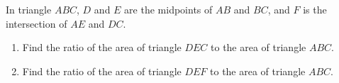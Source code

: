 In triangle $ABC$, $D$ and $E$ are the midpoints of $AB$ and $BC$, and $F$ is the intersection of $AE$ and $DC$.
\begin{enumerate}
\item[(a)] Find the ratio of the area of triangle $DEC$ to the area of triangle $ABC$.
\item[(b)] Find the ratio of the area of triangle $DEF$ to the area of triangle $ABC$.
\end{enumerate}
